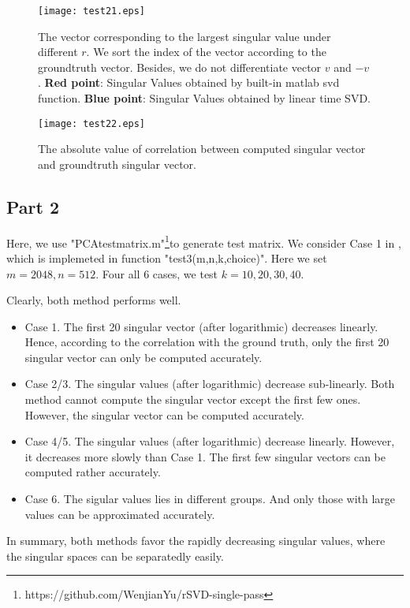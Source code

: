 \documentclass[conference,onecolumn,12pt]{IEEEtran}
\numberwithin{equation}{section}
\numberwithin{figure}{section}
\numberwithin{table}{section}
\theoremstyle{definition}
\begin{document}
\begin{figure}[htbp]
  \centering
  \texttt{[image: test21.eps]}
\caption{The vector corresponding to the largest singular value under different $r$. We sort the index of the vector according to the groundtruth vector. Besides, we do not differentiate vector $v$ and $-v$. {\bf Red point}: Singular Values obtained by built-in matlab svd function. {\bf Blue point}: Singular Values obtained by linear time SVD.}
\end{figure}

\begin{figure}[htbp]
  \centering
  \texttt{[image: test22.eps]}
\caption{The absolute value of correlation between computed singular vector and groundtruth singular vector.}
\end{figure}



\clearpage
\subsection{Part 2}
Here, we use "PCAtestmatrix.m"\footnote{https://github.com/WenjianYu/rSVD-single-pass}to generate test matrix. We consider Case 1 in \cite{yu2017single}, which is implemeted in function "test3(m,n,k,choice)". Here we set $m=2048, n=512$. Four all 6 cases, we test $k=10,20,30,40$. 

Clearly, both method performs well. 
\begin{itemize}
  \item Case 1. The first 20 singular vector (after logarithmic) decreases linearly. Hence, according to the correlation with the ground truth, only the first 20 singular vector can only be computed accurately.
  \item Case 2/3. The singular values (after logarithmic) decrease sub-linearly. Both method cannot compute the singular vector except the first few ones. However, the singular vector can be computed accurately.
  \item Case 4/5. The singular values (after logarithmic) decrease linearly. However, it decreases more slowly than Case 1. The first few singular vectors can be computed rather accurately. 
  \item Case 6. The sigular values lies in different groups. And only those with large values can be approximated accurately.
\end{itemize} 

In summary, both methods favor the rapidly decreasing singular values, where the singular spaces can be separatedly easily.
\end{document}
